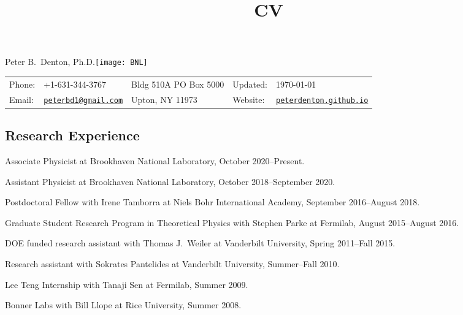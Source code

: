 \documentclass{article}
\title{CV}
\newif\ifhtlatex
\def\name{Peter B.~Denton, Ph.D.}
\renewenvironment{itemize}{
\begin{list}{}{
\setlength{\leftmargin}{.5em}}}{
\end{list}}
\begin{document}
\ifhtlatex
\Tag{TITLE+}{CV}
\fi


\vspace*{-0.5in}
{\huge \name}\hfill\texttt{[image: BNL]}\\
\vspace{0.1in}
\begin{tabular}{ll|l|ll}
Phone: & +1-631-344-3767 & Bldg 510A PO Box 5000 & Updated: & \today\\
Email: & \href{mailto:peterbd1@gmail.com}{\tt peterbd1@gmail.com} & Upton, NY 11973 & Website: & 
\href{http://peterdenton.github.io}{\tt peterdenton.github.io}
\end{tabular}

\subsection*{Research Experience}
\begin{itemize}
\item Associate Physicist at Brookhaven National Laboratory, October 2020--Present.
\item Assistant Physicist at Brookhaven National Laboratory, October 2018--September 2020.
\item Postdoctoral Fellow with Irene Tamborra at Niels Bohr International Academy, September 2016--August 2018.
\item Graduate Student Research Program in Theoretical Physics with Stephen Parke at Fermilab, August 2015--August 2016.
\item DOE funded research assistant with Thomas J.~Weiler at Vanderbilt University, Spring 2011--Fall 2015.
\item Research assistant with Sokrates Pantelides at Vanderbilt University, Summer--Fall 2010.
\item Lee Teng Internship with Tanaji Sen at Fermilab, Summer 2009.
\item Bonner Labs with Bill Llope at Rice University, Summer 2008.
\end{itemize}
\end{document}
